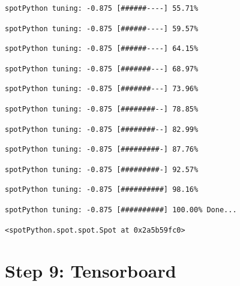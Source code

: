 \documentclass[
  letterpaper,
  DIV=11,
  numbers=noendperiod]{scrreprt}
\begin{document}
\begin{verbatim}
spotPython tuning: -0.875 [######----] 55.71% 
\end{verbatim}

\begin{verbatim}
spotPython tuning: -0.875 [######----] 59.57% 
\end{verbatim}

\begin{verbatim}
spotPython tuning: -0.875 [######----] 64.15% 
\end{verbatim}

\begin{verbatim}
spotPython tuning: -0.875 [#######---] 68.97% 
\end{verbatim}

\begin{verbatim}
spotPython tuning: -0.875 [#######---] 73.96% 
\end{verbatim}

\begin{verbatim}
spotPython tuning: -0.875 [########--] 78.85% 
\end{verbatim}

\begin{verbatim}
spotPython tuning: -0.875 [########--] 82.99% 
\end{verbatim}

\begin{verbatim}
spotPython tuning: -0.875 [#########-] 87.76% 
\end{verbatim}

\begin{verbatim}
spotPython tuning: -0.875 [#########-] 92.57% 
\end{verbatim}

\begin{verbatim}
spotPython tuning: -0.875 [##########] 98.16% 
\end{verbatim}

\begin{verbatim}
spotPython tuning: -0.875 [##########] 100.00% Done...
\end{verbatim}

\begin{verbatim}
<spotPython.spot.spot.Spot at 0x2a5b59fc0>
\end{verbatim}

\hypertarget{sec-tensorboard-18}{%
\section{Step 9: Tensorboard}\label{sec-tensorboard-18}}
\end{document}
